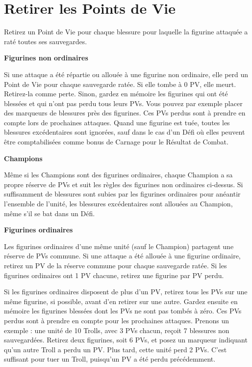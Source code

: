 \newpage
\section{Retirer les Points de Vie}

Retirez un Point de Vie pour chaque blessure pour laquelle la figurine attaquée a raté toutes ses sauvegardes.

\noindent\textbf{Figurines non ordinaires}

Si une attaque a été répartie ou allouée à une figurine non ordinaire, elle perd un Point de Vie pour chaque sauvegarde ratée. Si elle tombe à 0 PV, elle meurt. Retirez-la comme perte. Sinon, gardez en mémoire les figurines qui ont été blessées et qui n'ont pas perdu tous leurs PVs. Vous pouvez par exemple placer des marqueurs de blessures près des figurines. Ces PVs perdus sont à prendre en compte lors de prochaines attaques. Quand une figurine est tuée, toutes les blessures excédentaires sont ignorées, sauf dans le cas d'un Défi où elles peuvent être comptabilisées comme bonus de Carnage pour le Résultat de Combat. 

\noindent\textbf{Champions}

Même si les Champions sont des figurines ordinaires, chaque Champion a sa propre réserve de PVs et suit les règles des figurines non ordinaires ci-dessus. Si suffisamment de blessures sont subies par les figurines ordinaires pour anéantir l'ensemble de l'unité, les blessures excédentaires sont allouées au Champion, même s'il se bat dans un Défi.

\noindent\textbf{Figurines ordinaires}

Les figurines ordinaires d'une même unité (sauf le Champion) partagent une réserve de PVs commune. Si une attaque a été allouée à une figurine ordinaire, retirez un PV de la réserve commune pour chaque sauvegarde ratée. Si les figurines ordinaires ont 1 PV chacune, retirez une figurine par PV perdu.

Si les figurines ordinaires disposent de plus d'un PV, retirez tous les PVs sur une même figurine, si possible, avant d'en retirer sur une autre. Gardez ensuite en mémoire les figurines blessées dont les PVs ne sont pas tombés à zéro. Ces PVs perdus sont à prendre en compte pour les prochaines attaques. Prenons un exemple : une unité de 10 Trolls, avec 3 PVs chacun, reçoit 7 blessures non sauvegardées. Retirez deux figurines, soit 6 PVs, et posez un marqueur indiquant qu'un autre Troll a perdu un PV. Plus tard, cette unité perd 2 PVs. C'est suffisant pour tuer un Troll, puisqu'un PV a été perdu précédemment. 

